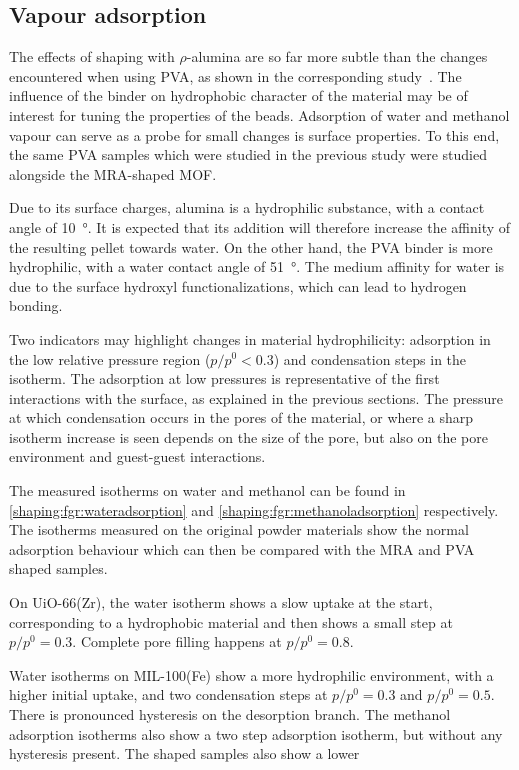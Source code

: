 
\subsection{Vapour adsorption}

The effects of shaping with \(\rho\)-alumina are 
so far more subtle than the changes encountered when using 
PVA, as shown in the corresponding 
study~\cite{chanutObservingEffectsShaping2016}.
The influence of the binder on hydrophobic character of the
material may be of interest for tuning the properties of the 
beads. Adsorption of water and methanol vapour can serve as 
a probe for small changes is surface properties.
To this end, the same PVA samples which were 
studied in the previous study were studied alongside 
the MRA-shaped MOF.

Due to its surface charges, alumina is a 
hydrophilic substance, with a contact 
angle of \SI{10}{\degree}. It is expected that its 
addition will therefore increase the affinity 
of the resulting pellet towards water. On the other hand,
the PVA binder is more hydrophilic, with a water contact
angle of \SI{51}{\degree}. The medium affinity for water
is due to the surface hydroxyl functionalizations, which
can lead to hydrogen bonding.

Two indicators may highlight 
changes in material hydrophilicity: adsorption in the 
low relative pressure region (\(p/p^0 < 0.3\)) and 
condensation steps in the isotherm. The adsorption at low
pressures is representative of the first interactions with the 
surface, as explained in the previous sections. The pressure 
at which condensation occurs in the pores of the material, or 
where a sharp isotherm increase is seen depends on the 
size of the pore, but also on the pore environment and 
guest-guest interactions.

The measured isotherms on water and methanol can be found
in \autoref{shaping:fgr:wateradsorption} 
and \autoref{shaping:fgr:methanoladsorption} respectively.
The isotherms measured on the original powder materials 
show the normal adsorption behaviour which can then be 
compared with the MRA and PVA shaped samples. 

On UiO-66(Zr), the water isotherm shows a slow uptake at the 
start, corresponding to a hydrophobic material and then shows 
a small step at \(p/p^0 = 0.3\). Complete pore filling happens 
at \(p/p^0 = 0.8\).

Water isotherms on MIL-100(Fe) show a more hydrophilic environment,
with a higher initial uptake, and two condensation steps at 
\(p/p^0 = 0.3\) and \(p/p^0 = 0.5\). There is pronounced 
hysteresis on the desorption branch.
The methanol adsorption isotherms also show a two step adsorption
isotherm, but without any hysteresis present. The shaped samples 
also show a lower 

